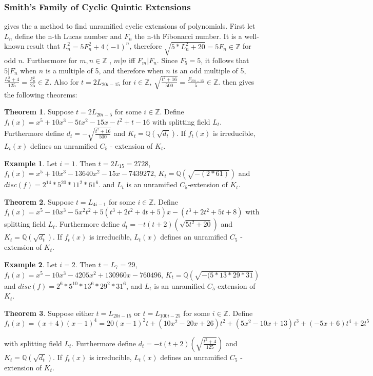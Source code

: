 \documentclass[12pt]{extarticle}
\newcommand{\Q}{\mathbb{Q}}
\newcommand{\Z}{\mathbb{Z}}
\newcommand{\<}{\langle}
\renewcommand{\>}{\rangle}
\theoremstyle{definition}
\newtheorem{theorem}{Theorem}
\newtheorem*{example}{Example}
\begin{document}
\subsubsection{Smith's Family of Cyclic Quintic Extensions}
\cite{SMITH} gives the a method to find unramified cyclic extensions of polynomials. First let $L_n$ define the n-th Lucas number and $F_n$ the n-th Fibonacci number. It is a well-known result that $L_n^2 = 5F_n^2+4(-1)^n$, therefore $\sqrt{5*L_n^2+20} = 5F_n \in \mathbb{Z}$ for odd $n$. Furthermore for $m,n \in \Z$ , $m|n$ iff $F_m | F_n$. Since $F_5 = 5$, it follows that $5| F_n $ when $n$ is a multiple of 5, and therefore when $n$ is an odd multiple of 5, $\frac{L_n^2+4}{125} = \frac{F_n^2}{25} \in \Z$. Also for $t = 2L_{20i-15}$ for $i \in \Z$, $\sqrt{\frac{t^2+16}{500}} = \frac{F_{20i-15}}{5} \in \Z$. 
\cite{SMITH} then gives the following theorems:
\begin{theorem}
Suppose $t = 2L_{20i-5}$ for some $i \in \Z$. Define $f_t(x) = x^5 + 10x^3 - 5tx^2-15x-t^2+t-16$ with splitting field $L_t$. Furthermore define $d_t = -\sqrt{\frac{t^2+16}{500}}$ and $K_t = \Q(\sqrt{d_t})$. If $f_t(x)$ is irreducible, $L_t(x)$ defines an unramified $C_5$ - extension of $K_t$. 
\end{theorem}
\begin{example}
Let $i=1$. Then $t=2L_{15} = 2728$, $f_t(x) = x^5 + 10x^3 - 13640x^2 - 15x - 7439272$, $K_t = \Q(\sqrt{-(2*61)})$ and $disc(f) = 2^{14} * 5^{20} * 11^2 * 61^6$. and $L_t$ is an unramified $C_5$-extension of $K_t$. 
\end{example}
\begin{theorem}
Suppose $t = L_{4i-1}$ for some $i \in \Z$. Define $f_t(x) = x^5 -10x^3 - 5x^2t^2+5(t^3+2t^2+4t+5)x-(t^3+2t^2+5t+8)$ with splitting field $L_t$. Furthermore define $d_t = -t(t+2)(\sqrt{5t^2+20})$ and $K_t = \Q(\sqrt{d_t})$. If $f_t(x)$ is irreducible, $L_t(x)$ defines an unramified $C_5$ - extension of $K_t$.
\end{theorem}
\begin{example}
Let $i=2$. Then $t=L_{7} = 29$, $f_t(x) = x^5 - 10x^3 - 4205x^2 + 130960x - 760496$, $K_t = \Q(\sqrt{-( 5 * 13 * 29 * 31})$ and $disc(f) =2^6 * 5^{10} * 13^6 * 29^2 * 31^6$,  and $L_t$ is an unramified $C_5$-extension of $K_t$. 
\end{example}
\begin{theorem}
Suppose either $t = L_{20i-15}$ or $t = L_{100i-25}$ for some $i \in \Z$. Define $f_t(x) = (x+4)(x-1)^4 = 20(x-1)^2t + (10x^2-20x+26)t^2 + (5x^2-10x+13)t^3 +(-5x+6)t^4 + 2t^5$

 with splitting field $L_t$. Furthermore define $d_t = -t(t+2)\left(\sqrt{\frac{t^2+4}{125}}\right)$ and $K_t = \Q(\sqrt{d_t})$. If $f_t(x)$ is irreducible, $L_t(x)$ defines an unramified $C_5$ - extension of $K_t$. 
\end{theorem}
\end{document}
